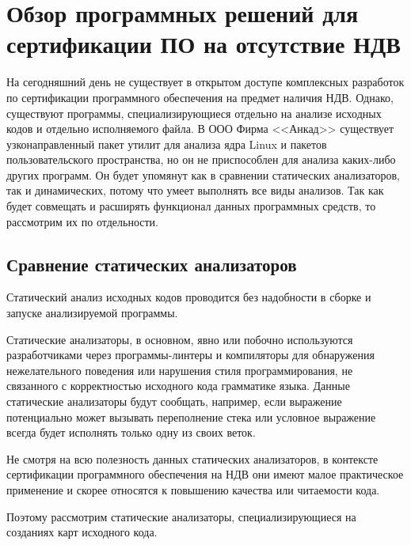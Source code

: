 \section{Обзор программных решений для сертификации ПО на отсутствие НДВ}\label{sec:ch1/sec3}
На сегодняшний день не существует в открытом доступе комплексных разработок по сертификации программного 
обеспечения на предмет наличия НДВ.
Однако, существуют программы, специализирующиеся отдельно на анализе исходных кодов
и отдельно исполняемого файла. В ООО Фирма <<Анкад>> существует узконаправленный пакет утилит для анализа ядра 
Linux и пакетов пользовательского пространства, но он не приспособлен для анализа каких-либо других программ. Он будет 
упомянут как в сравнении статических анализаторов, так и динамических, потому что умеет выполнять все виды анализов.
Так как {\ProgModule} будет совмещать и расширять функционал
данных программных средств, то рассмотрим их по отдельности.

\subsection{Сравнение статических анализаторов}\label{sec:ch1/sec3/sub1}
Статический анализ исходных кодов проводится без надобности в сборке и запуске 
анализируемой программы. 

Статические анализаторы, в основном, явно или побочно используются разработчиками через программы-линтеры и компиляторы
для обнаружения нежелательного поведения или нарушения стиля программирования, не связанного с корректностью
исходного кода грамматике языка. 
Данные статические анализаторы будут сообщать, например, если выражение потенциально
может вызывать переполнение стека или условное выражение всегда будет исполнять только одну
из своих веток.

Не смотря на всю полезность данных статических анализаторов, в контексте сертификации
программного обеспечения на НДВ они имеют малое практическое применение и
скорее относятся к повышению качества или читаемости кода.

Поэтому рассмотрим статические анализаторы, специализирующиеся на созданиях карт исходного кода.

